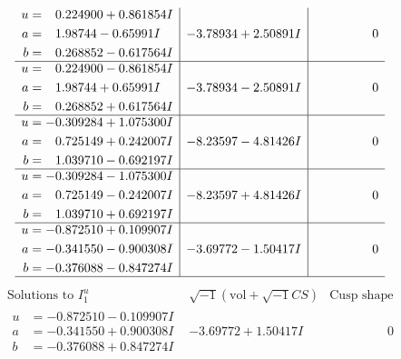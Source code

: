 \documentclass[1p]{elsarticle_modified}
\theoremstyle{definition}
\newcommand{\I}{\sqrt{-1}}
\begin{document}
$$\begin{array}{c|c|c}
\begin{aligned}
u &= \phantom{-}0.224900 + 0.861854 I \\
a &= \phantom{-}1.98744 - 0.65991 I \\
b &= \phantom{-}0.268852 - 0.617564 I\end{aligned}
 & -3.78934 + 2.50891 I & \phantom{-0.000000 } 0 \\ \hline\begin{aligned}
u &= \phantom{-}0.224900 - 0.861854 I \\
a &= \phantom{-}1.98744 + 0.65991 I \\
b &= \phantom{-}0.268852 + 0.617564 I\end{aligned}
 & -3.78934 - 2.50891 I & \phantom{-0.000000 } 0 \\ \hline\begin{aligned}
u &= -0.309284 + 1.075300 I \\
a &= \phantom{-}0.725149 + 0.242007 I \\
b &= \phantom{-}1.039710 - 0.692197 I\end{aligned}
 & -8.23597 - 4.81426 I & \phantom{-0.000000 } 0 \\ \hline\begin{aligned}
u &= -0.309284 - 1.075300 I \\
a &= \phantom{-}0.725149 - 0.242007 I \\
b &= \phantom{-}1.039710 + 0.692197 I\end{aligned}
 & -8.23597 + 4.81426 I & \phantom{-0.000000 } 0 \\ \hline\begin{aligned}
u &= -0.872510 + 0.109907 I \\
a &= -0.341550 - 0.900308 I \\
b &= -0.376088 - 0.847274 I\end{aligned}
 & -3.69772 - 1.50417 I & \phantom{-0.000000 } 0\\
 \hline 
 \end{array}$$\newpage$$\begin{array}{c|c|c}  
\text{Solutions to }I^u_{1}& \I (\text{vol} + \sqrt{-1}CS) & \text{Cusp shape}\\
 \hline 
\begin{aligned}
u &= -0.872510 - 0.109907 I \\
a &= -0.341550 + 0.900308 I \\
b &= -0.376088 + 0.847274 I\end{aligned}
 & -3.69772 + 1.50417 I & \phantom{-0.000000 } 0 \\ \hline\begin{aligned}

\end{aligned}
\end{array}$$
\end{document}
